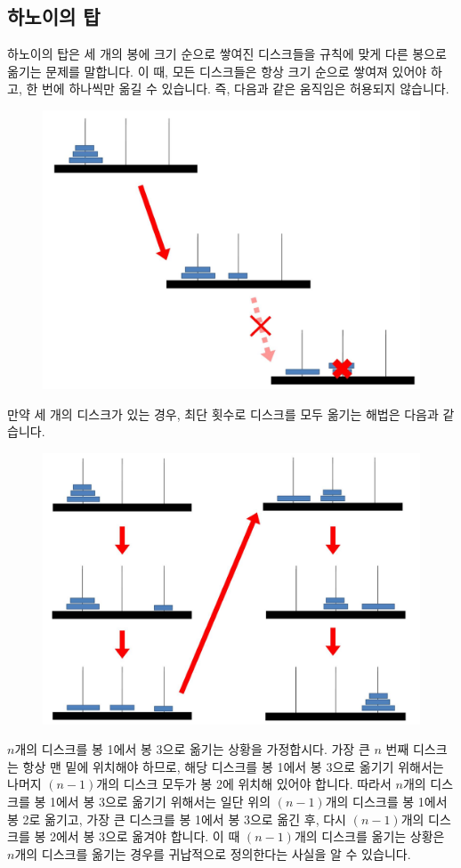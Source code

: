 \documentclass[../main.tex]{subfiles}
\begin{document}
\subsection{하노이의 탑}
하노이의 탑은 세 개의 봉에 크기 순으로 쌓여진 디스크들을 규칙에 맞게 다른 봉으로 옮기는 문제를 말합니다.
이 때, 모든 디스크들은 항상 크기 순으로 쌓여져 있어야 하고, 한 번에 하나씩만 옮길 수 있습니다.
즉, 다음과 같은 움직임은 허용되지 않습니다.

\begin{figure}[H]
\centering
\includegraphics[width=0.7\linewidth]{"./lectures/lecture8_hanoi_rule"}
\label{fig:lecture8hanoirule}
\end{figure}

만약 세 개의 디스크가 있는 경우, 최단 횟수로 디스크를 모두 옮기는 해법은 다음과 같습니다.

\begin{figure}[H]
\centering
\includegraphics[width=0.7\linewidth]{"./lectures/lecture8_hanoi_3"}
\label{fig:lecture8hanoi3}
\end{figure}

$n$개의 디스크를 봉 1에서 봉 3으로 옮기는 상황을 가정합시다.
가장 큰 $n$ 번째 디스크는 항상 맨 밑에 위치해야 하므로, 해당 디스크를 봉 1에서 봉 3으로 옮기기 위해서는 나머지 $(n - 1)$개의 디스크 모두가 봉 2에 위치해 있어야 합니다.
따라서 $n$개의 디스크를 봉 1에서 봉 3으로 옮기기 위해서는 일단 위의 $(n - 1)$개의 디스크를 봉 1에서 봉 2로 옮기고, 가장 큰 디스크를 봉 1에서 봉 3으로 옮긴 후, 다시 $(n - 1)$개의 디스크를 봉 2에서 봉 3으로 옮겨야 합니다.
이 때 $(n - 1)$개의 디스크를 옮기는 상황은 $n$개의 디스크를 옮기는 경우를 귀납적으로 정의한다는 사실을 알 수 있습니다.
\end{document}
